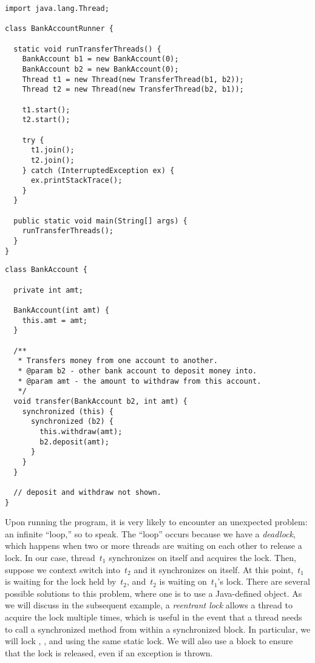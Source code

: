 \begin{lstlisting}[language=MyJava]
import java.lang.Thread;

class BankAccountRunner {

  static void runTransferThreads() {
    BankAccount b1 = new BankAccount(0);
    BankAccount b2 = new BankAccount(0);
    Thread t1 = new Thread(new TransferThread(b1, b2));
    Thread t2 = new Thread(new TransferThread(b2, b1));

    t1.start();
    t2.start();

    try {
      t1.join();
      t2.join();
    } catch (InterruptedException ex) { 
      ex.printStackTrace(); 
    }
  }

  public static void main(String[] args) {
    runTransferThreads();
  }
}
\end{lstlisting}

\begin{lstlisting}[language=MyJava]
class BankAccount {

  private int amt;

  BankAccount(int amt) { 
    this.amt = amt; 
  }

  /**
   * Transfers money from one account to another.
   * @param b2 - other bank account to deposit money into.
   * @param amt - the amount to withdraw from this account.
   */
  void transfer(BankAccount b2, int amt) {
    synchronized (this) {
      synchronized (b2) {
        this.withdraw(amt);
        b2.deposit(amt);
      }
    }
  }

  // deposit and withdraw not shown.
}
\end{lstlisting}

Upon running the program, it is very likely to encounter an unexpected problem: an infinite ``loop,'' so to speak. 
The ``loop'' occurs because we have a \emph{deadlock}, which happens when two or more threads are waiting on each other to release a lock. 
In our case, thread~$t_1$ synchronizes on itself and acquires the lock. 
Then, suppose we context switch into~$t_2$ and it synchronizes on itself. 
At this point,~$t_1$ is waiting for the lock held by~$t_2$, and~$t_2$ is waiting on~$t_1$'s lock. 
There are several possible solutions to this problem, where one is to use a Java-defined  object. 
As we will discuss in the subsequent example, a \emph{reentrant lock} allows a thread to acquire the lock multiple times, which is useful in the event that a thread needs to call a synchronized method from within a synchronized block. 
In particular, we will lock , , and  using the same static lock. 
We will also use a  block to ensure that the lock is released, even if an exception is thrown.

